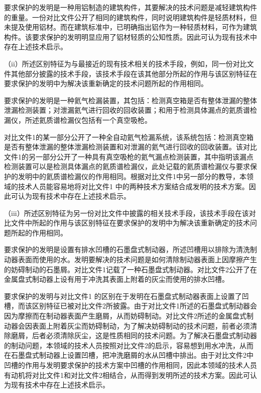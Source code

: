 {\par}

要求保护的发明是一种用铝制造的建筑构件，其要解决的技术问题是减轻建筑构件的重量。一份对比文件公开了相同的建筑构件，同时说明建筑构件是轻质材料，但未提及使用铝材。而在建筑标准中，已明确指出铝作为一种轻质材料，可作为建筑构件。该要求保护的发明明显应用了铝材轻质的公知性质。因此可认为现有技术中存在上述技术启示。

{\setlength{\parindent}{17.1bp}（ii）所述区别特征为与最接近的现有技术相关的技术手段，例如，同一份对比文件其他部分披露的技术手段，该技术手段在该其他部分所起的作用与该区别特征在要求保护的发明中为解决该重新确定的技术问题所起的作用相同。\par}

{\par}

要求保护的发明是一种氦气检漏装置，其包括：检测真空箱是否有整体泄漏的整体泄漏检测装置；对泄漏氦气进行回收的回收装置；和用于检测具体漏点的氦质谱检漏仪，所述氦质谱检漏仪包括有一个真空吸枪。

对比文件1的某一部分公开了一种全自动氦气检漏系统，该系统包括：检测真空箱是否有整体泄漏的整体泄漏检测装置和对泄漏的氦气进行回收的回收装置。该对比文件1的另一部分公开了一种具有真空吸枪的氦气漏点检测装置，其中指明该漏点检测装置可以是检测具体漏点的氦质谱检漏仪，此处记载的氦质谱检漏仪与要求保护的发明中的氦质谱检漏仪的作用相同。根据对比文件1中另一部分的教导，本领域的技术人员能容易地将对比文件1 中的两种技术方案结合成发明的技术方案。因此可认为现有技术中存在上述技术启示。

{\setlength{\parindent}{17.1bp}（iii）所述区别特征为另一份对比文件中披露的相关技术手段，该技术手段在该对比文件中所起的作用与该区别特征在要求保护的发明中为解决该重新确定的技术问题所起的作用相同。\par}

{\par}

要求保护的发明是设置有排水凹槽的石墨盘式制动器，所述凹槽用以排除为清洗制动器表面而使用的水。发明要解决的技术问题是如何清除制动器表面上因摩擦产生的妨碍制动的石墨屑。对比文件1记载了一种石墨盘式制动器。对比文件2公开了在金属盘式制动器上设有用于冲洗其表面上附着的灰尘而使用的排水凹槽。

要求保护的发明与对比文件1 的区别在于发明在石墨盘式制动器表面上设置了凹槽，而该区别特征已被对比文件2所披露。由于对比文件1所述的石墨盘式制动器会因为摩擦而在制动器表面产生磨屑，从而妨碍制动。对比文件2所述的金属盘式制动器会因表面上附着灰尘而妨碍制动，为了解决妨碍制动的技术问题，前者必须清除磨屑，后者必须清除灰尘，这是性质相同的技术问题。为了解决石墨盘式制动器的制动问题，本领域的技术人员按照对比文件2的启示，容易想到用水冲洗，从而在石墨盘式制动器上设置凹槽，把冲洗磨屑的水从凹槽中排出。由于对比文件2中凹槽的作用与发明要求保护的技术方案中凹槽的作用相同，因此本领域的技术人员有动机将对比文件1和对比文件2相结合，从而得到发明所述的技术方案。因此可认为现有技术中存在上述技术启示。

